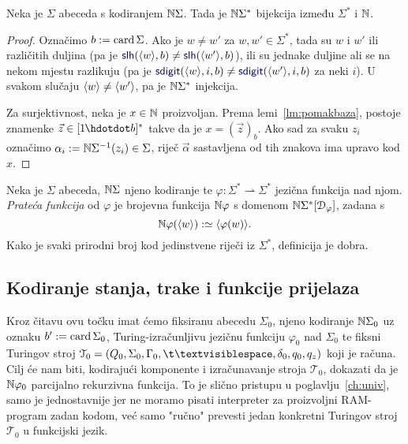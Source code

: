 \begin{propozicija}[{name=[bijektivnost kodiranja riječi]}]\label{pp:bijkr}
Neka je $\Sigma$ abeceda s kodiranjem ${\mathbb N}\Sigma$.
    Tada je ${\mathbb N}\Sigma^*$ bijekcija između $\Sigma^*$ i ${\mathbb N}$.
\end{propozicija}
\begin{proof}
Označimo $b:=\operatorname{card}\Sigma$. Ako je $w\ne w'$ za $w,w'\in\Sigma^*$, tada su $w$ i $w'$ ili različitih duljina (pa je $\f{slh}(\kr w,b)\ne\f{slh}(\kr{w'},b)$), ili su jednake duljine ali se na nekom mjestu razlikuju (pa je $\f{sdigit}(\kr w,i,b)\ne\f{sdigit}(\kr{w'},i,b)$ za neki $i$).
U svakom slučaju $\langle w\rangle\ne\langle w'\rangle$, pa je ${\mathbb N}\Sigma^*$ injekcija.

	Za surjektivnost, neka je $x\in{\mathbb N}$ proizvoljan. Prema lemi~\ref{lm:pomakbaza}, postoje znamenke $\vec z\in[1\mspace{-1mu}\dd b]^*$ takve da je $x=(\vec z)_b$. Ako sad za svaku $z_i$ označimo $\alpha_i:={\mathbb N}\Sigma^{-1}(z_i)\in\Sigma$, riječ $\vec\alpha$ sastavljena od tih znakova ima upravo kod $x$.
\end{proof}


\begin{definicija}[{name=[prateća funkcija jezične funkcije]}]\label{def:kodfi}
Neka je $\Sigma$ abeceda, ${\mathbb N}\Sigma$ njeno kodiranje te $\varphi:\Sigma^*\rightharpoonup\Sigma^*$ jezična funkcija nad njom. \emph{Prateća funkcija} od $\varphi$ je brojevna funkcija ${\mathbb N}\varphi$ s domenom ${\mathbb N}\Sigma^*[\mathcal D_{\varphi}]$, zadana s
\begin{equation}\label{eq:kodfidef}
    {\mathbb N}\varphi(\langle w\rangle):\simeq\langle\varphi(w)\rangle\text.
\end{equation}
Kako je svaki prirodni broj kod jedinstvene riječi iz $\Sigma^*$, definicija je dobra.
\end{definicija}

\subsection{Kodiranje stanja, trake i funkcije prijelaza}

Kroz čitavu ovu točku imat ćemo fiksiranu abecedu $\Sigma_0$, njeno kodiranje ${\mathbb N}\Sigma_0$ uz oznaku $b':=\operatorname{card}\Sigma_0$, Turing-izračunljivu jezičnu funkciju $\varphi_0$ nad $\Sigma_0$ te fiksni Turingov stroj $\mathcal T_0=(Q_0,\Sigma_0,\Gamma_0,\bl,\delta_0,q_0,q_z)$ koji je računa. Cilj će nam biti, kodirajući komponente i izračunavanje stroja $\mathcal T_0$, dokazati da je ${\mathbb N}\varphi_0$ parcijalno rekurzivna funkcija. To je slično pristupu u poglavlju~\ref{ch:univ}, samo je jednostavnije jer ne moramo pisati interpreter za proizvoljni RAM-program zadan kodom, već samo "ručno" prevesti jedan konkretni Turingov stroj $\mathcal T_0$ u funkcijski jezik.

